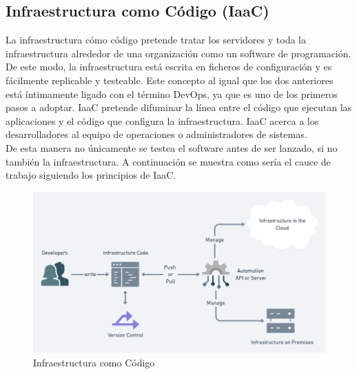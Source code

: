 	\subsection{Infraestructura como Código (IaaC)}
		\begin{text}
			La infraestructura cómo código pretende tratar los servidores y toda la infraestructura alrededor de una organización como un software de programación. De este modo, la infraestructura está escrita en ficheros de configuración y es fácilmente replicable y testeable. Este concepto al igual que los dos anteriores está íntimamente ligado con el término DevOps, ya que es uno de los primeros pasos a adoptar. IaaC pretende difuminar la línea entre el código que ejecutan las aplicaciones y el código que configura la infraestructura. IaaC acerca a los desarrolladores al equipo de operaciones o administradores de sistemas. \\
			De esta manera no únicamente se testea el software antes de ser lanzado, si no también la infraestructura. A continuación se muestra como sería el cauce de trabajo siguiendo los principios de IaaC.
			
			\begin{figure}[!hbt]
				\centering
				\includegraphics[scale=0.45]{imagenes/Introduccion/Conceptos_Basicos/IaaC.png}
				\caption[Infraestructura como Código]{Infraestructura como Código \cite{WhatIsIaaC:online}}
				\label{infraestructura_como_codigo} 
			\end{figure}
		\end{text}
	
